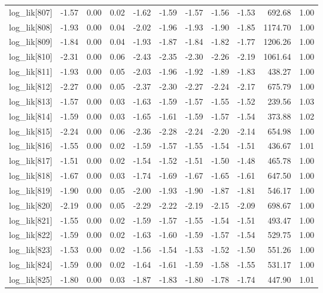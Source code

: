 \begin{table}[ht]
\begin{tabular}{rrrrrrrrrrr}
  log\_lik[807] & -1.57 & 0.00 & 0.02 & -1.62 & -1.59 & -1.57 & -1.56 & -1.53 & 692.68 & 1.00 \\ 
  log\_lik[808] & -1.93 & 0.00 & 0.04 & -2.02 & -1.96 & -1.93 & -1.90 & -1.85 & 1174.70 & 1.00 \\ 
  log\_lik[809] & -1.84 & 0.00 & 0.04 & -1.93 & -1.87 & -1.84 & -1.82 & -1.77 & 1206.26 & 1.00 \\ 
  log\_lik[810] & -2.31 & 0.00 & 0.06 & -2.43 & -2.35 & -2.30 & -2.26 & -2.19 & 1061.64 & 1.00 \\ 
  log\_lik[811] & -1.93 & 0.00 & 0.05 & -2.03 & -1.96 & -1.92 & -1.89 & -1.83 & 438.27 & 1.00 \\ 
  log\_lik[812] & -2.27 & 0.00 & 0.05 & -2.37 & -2.30 & -2.27 & -2.24 & -2.17 & 675.79 & 1.00 \\ 
  log\_lik[813] & -1.57 & 0.00 & 0.03 & -1.63 & -1.59 & -1.57 & -1.55 & -1.52 & 239.56 & 1.03 \\ 
  log\_lik[814] & -1.59 & 0.00 & 0.03 & -1.65 & -1.61 & -1.59 & -1.57 & -1.54 & 373.88 & 1.02 \\ 
  log\_lik[815] & -2.24 & 0.00 & 0.06 & -2.36 & -2.28 & -2.24 & -2.20 & -2.14 & 654.98 & 1.00 \\ 
  log\_lik[816] & -1.55 & 0.00 & 0.02 & -1.59 & -1.57 & -1.55 & -1.54 & -1.51 & 436.67 & 1.01 \\ 
  log\_lik[817] & -1.51 & 0.00 & 0.02 & -1.54 & -1.52 & -1.51 & -1.50 & -1.48 & 465.78 & 1.00 \\ 
  log\_lik[818] & -1.67 & 0.00 & 0.03 & -1.74 & -1.69 & -1.67 & -1.65 & -1.61 & 647.50 & 1.00 \\ 
  log\_lik[819] & -1.90 & 0.00 & 0.05 & -2.00 & -1.93 & -1.90 & -1.87 & -1.81 & 546.17 & 1.00 \\ 
  log\_lik[820] & -2.19 & 0.00 & 0.05 & -2.29 & -2.22 & -2.19 & -2.15 & -2.09 & 698.67 & 1.00 \\ 
  log\_lik[821] & -1.55 & 0.00 & 0.02 & -1.59 & -1.57 & -1.55 & -1.54 & -1.51 & 493.47 & 1.00 \\ 
  log\_lik[822] & -1.59 & 0.00 & 0.02 & -1.63 & -1.60 & -1.59 & -1.57 & -1.54 & 529.75 & 1.00 \\ 
  log\_lik[823] & -1.53 & 0.00 & 0.02 & -1.56 & -1.54 & -1.53 & -1.52 & -1.50 & 551.26 & 1.00 \\ 
  log\_lik[824] & -1.59 & 0.00 & 0.02 & -1.64 & -1.61 & -1.59 & -1.58 & -1.55 & 531.17 & 1.00 \\ 
  log\_lik[825] & -1.80 & 0.00 & 0.03 & -1.87 & -1.83 & -1.80 & -1.78 & -1.74 & 447.90 & 1.01 \\ 

\end{tabular}
\end{table}
